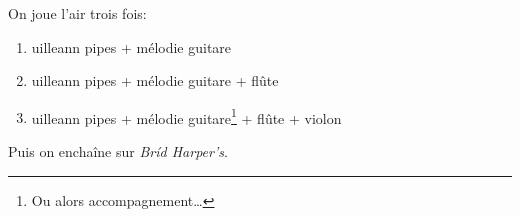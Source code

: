 On joue l'air trois fois:

\begin{enumerate}
\item uilleann pipes + mélodie guitare
\item uilleann pipes + mélodie guitare + flûte
\item uilleann pipes + mélodie guitare\footnote{Ou alors
  accompagnement\ldots} + flûte + violon
\end{enumerate}

Puis on enchaîne sur \emph{Br\'id Harper's}.

\tune
